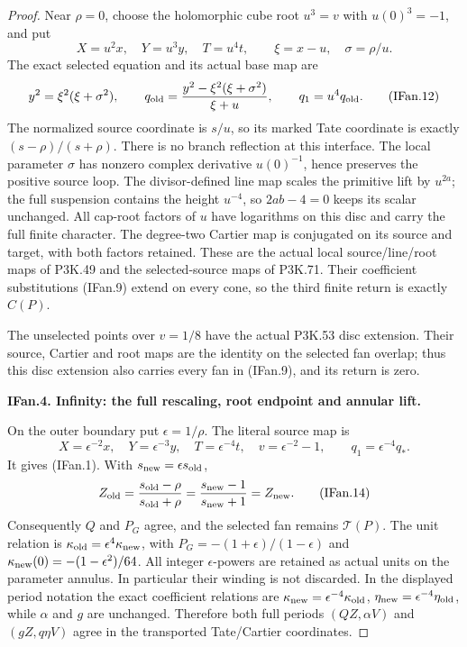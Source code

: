 \begin{proof}
Near \(\rho=0\), choose the holomorphic cube root \(u^3=v\) with
\(u(0)^3=-1\), and put
\[
 X=u^2x,\quad Y=u^3y,\quad T=u^4t,\qquad
 \xi=x-u,\quad \sigma=\rho/u.
\]
The exact selected equation and its actual base map are
\[
 y^2=\xi^2(\xi+\sigma^2),\qquad
 q_{\rm old}=\frac{y^2-\xi^2(\xi+\sigma^2)}{\xi+u},
 \qquad q_1=u^4q_{\rm old}.                         \tag{IFan.12}
\]
The normalized source coordinate is \(s/u\), so its marked Tate
coordinate is exactly \((s-\rho)/(s+\rho)\). There is no branch
reflection at this interface. The local parameter \(\sigma\) has
nonzero complex derivative \(u(0)^{-1}\), hence preserves the
positive source loop. The divisor-defined line map scales the
primitive lift by \(u^{2a}\); the full suspension contains the
height \(u^{-4}\), so \(2ab-4=0\) keeps its scalar unchanged.
All cap-root factors of \(u\) have logarithms on this disc and carry
the full finite character. The degree-two Cartier map is conjugated
on its source and target, with both factors retained. These are the
actual local source/line/root maps of P3K.49 and the selected-source
maps of P3K.71. Their coefficient substitutions (IFan.9) extend on
every cone, so the third finite return is exactly \(C(P)\).

The unselected points over \(v=1/8\) have the actual P3K.53 disc
extension. Their source, Cartier and root maps are the identity on
the selected fan overlap; thus this disc extension also carries
every fan in (IFan.9), and its return is zero.

\par\medskip\noindent\textbf{IFan.4. Infinity: the full rescaling, root endpoint and annular lift.}\par\nopagebreak[4]

On the outer boundary put \(\epsilon=1/\rho\). The literal source
map is
\[
 X=\epsilon^{-2}x,\quad Y=\epsilon^{-3}y,\quad
 T=\epsilon^{-4}t,\quad v=\epsilon^{-2}-1,
 \qquad q_1=\epsilon^{-4}q_*.                       \tag{IFan.13}
\]
It gives (IFan.1). With \(s_{\rm new}=\epsilon s_{\rm old}\),
\[
 Z_{\rm old}=\frac{s_{\rm old}-\rho}{s_{\rm old}+\rho}
       =\frac{s_{\rm new}-1}{s_{\rm new}+1}
       =Z_{\rm new}.                               \tag{IFan.14}
\]
Consequently \(Q\) and \(P_G\) agree, and the selected fan remains
\(\mathcal T(P)\). The unit relation is
\(\kappa_{\rm old}=\epsilon^4\kappa_{\rm new}\), with
\(P_G=-(1+\epsilon)/(1-\epsilon)\) and
\(\kappa_{\rm new}(0)=-(1-\epsilon^2)/64\).
All integer \(\epsilon\)-powers are retained as actual units on the
parameter annulus. In particular their winding is not discarded.
In the displayed period notation the exact coefficient relations are
\(\kappa_{\rm new}=\epsilon^{-4}\kappa_{\rm old}\),
\(\eta_{\rm new}=\epsilon^{-4}\eta_{\rm old}\), while
\(\alpha\) and \(g\) are unchanged. Therefore both full periods
\((QZ,\alpha V)\) and \((gZ,q\eta V)\) agree in the transported
Tate/Cartier coordinates.


\end{proof}
